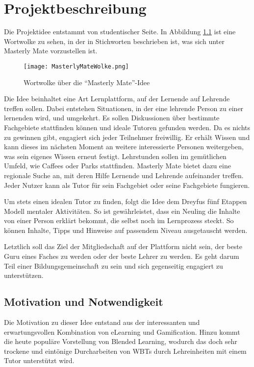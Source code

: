\chapter{Projektbeschreibung}
Die Projektidee entstammt von studentischer Seite. In Abbildung
\ref{ref:wolkeMM} ist eine Wortwolke zu sehen, in der in Stichworten beschrieben
ist, was sich unter Masterly Mate vorzustellen ist.

\begin{figure}[H]
\texttt{[image: MasterlyMateWolke.png]}
\caption{Wortwolke über die "`Masterly Mate"'-Idee}\label{ref:wolkeMM}
\end{figure}

Die Idee beinhaltet eine Art Lernplattform, auf der Lernende auf Lehrende
treffen sollen. Dabei entstehen Situationen, in der eine lehrende Person zu
einer lernenden wird, und umgekehrt. Es sollen Diskussionen über bestimmte
Fachgebiete stattfinden können und ideale Tutoren gefunden werden. Da es nichts
zu gewinnen gibt, engagiert sich jeder Teilnehmer freiwillig. Er erhält Wissen
und kann dieses im nächsten Moment an weitere interessierte Personen
weitergeben, was sein eigenes Wissen erneut festigt. Lehrstunden sollen im
gemütlichen Umfeld, wie Caffees oder Parks stattfinden. Masterly Mate bietet
dazu eine regionale Suche an, mit deren Hilfe Lernende und Lehrende aufeinander
treffen. Jeder Nutzer kann als Tutor für sein Fachgebiet oder seine Fachgebiete
fungieren.

Um stets einen idealen Tutor zu finden, folgt die Idee dem Dreyfus fünf
Etappen Modell mentaler Aktivitäten. So ist gewährleistet, dass ein Neuling die
Inhalte von einer Person erklärt bekommt, die selbst noch im Lernprozess steckt.
So können Inhalte, Tipps und Hinweise auf passendem Niveau ausgetauscht werden.

Letztlich soll das Ziel der Mitgliedschaft auf der Plattform nicht sein, der
beste Guru eines Faches zu werden oder der beste Lehrer zu werden. Es geht darum
Teil einer Bildungsgemeinschaft zu sein und sich gegenseitig engagiert zu
unterstützen.

\section{Motivation und Notwendigkeit}\label{ref:projectMotivation}
Die Motivation zu dieser Idee entstand aus der interessanten und
erwartungsvollen Kombination von eLearning und Gamification. Hinzu kommt die
heute populäre Vorstellung von Blended Learning, wodurch das doch sehr trockene
und eintönige Durcharbeiten von WBTs durch Lehreinheiten mit einem Tutor
unterstützt wird.


